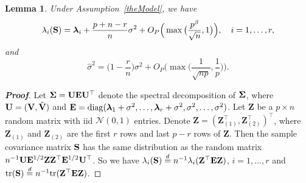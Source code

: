 \documentclass[times,sort&compress,3p]{elsarticle}
\newcommand{\mytr}{ {\rm tr} }
\newcommand{\mydiag}{ {\rm diag} }
\newcommand{\bZ}{\mathbf{Z}}
\newcommand{\bfsym}[1]{\ensuremath{\boldsymbol{#1}}}
\def\blambda {\bfsym {\lambda}}        \def\bLambda {\bfsym {\Lambda}}
\theoremstyle{plain}
\newtheorem{lemma}{\quad\quad Lemma}
\theoremstyle{definition}
\theoremstyle{remark}
\begin{document}
\begin{appendices}
\begin{lemma}\label{eigenconsisLemma}
    Under Assumption~\ref{theModel}, we have
    \begin{equation}\label{eigenconsisResult1}
        \lambda_i(\BS)= \blambda_i+\frac{p+n-r}{n}\sigma^2+
        O_P\Big(\max\big(\frac{p^{\beta}}{\sqrt{n}},1\big)\Big),\quad i=1,\ldots, r,
    \end{equation}
    and
    \begin{equation}\label{eigenconsisResult2}
        \hat{\sigma}^2=
\big(1-\frac{r}{n}\big)\sigma^2+
O_P\Big(\max\big(\frac{1}{\sqrt{np}},\frac{1}{p}\big)\Big).
    \end{equation}
\end{lemma}
\begin{proof}[\textbf{Proof}]
    Let $\bSigma=\BU\BE\BU^\top $ denote the spectral decomposition of $\bSigma$, where
     $\mathbf{U}=(\mathbf{V},\tilde{\mathbf{V}})$ and $\BE=\mydiag(\blambda_1+\sigma^2,\ldots,\blambda_r+\sigma^2,\sigma^2,\ldots,\sigma^2)$.
    Let $\bZ$ be a $p\times n$ random matrix with iid $\mathcal{N}(0,1)$ entries.
Denote $\bZ={(\bZ_{(1)}^\top ,\bZ_{(2)}^\top )}^\top $, where $\bZ_{(1)}$ and $\bZ_{(2)}$ are the first $r$ rows and last $p-r$ rows of $\bZ$. 
Then the sample covariance matrix $\mathbf{S}$ has the same distribution as the random matrix
$
    n^{-1} \BU \BE^{1/2} \bZ \bZ^\top  \BE^{1/2} \BU^\top 
$.
    So we have $\lambda_i(\BS)\overset{d}{=} n^{-1}\lambda_i(\bZ^\top  \BE \bZ)$, $i=1,\ldots,r$ and $\mytr(\BS)\overset{d}{=} n^{-1}\mytr(\BZ^\top  \BE \BZ)$.


\end{proof}
\end{appendices}
\end{document}
